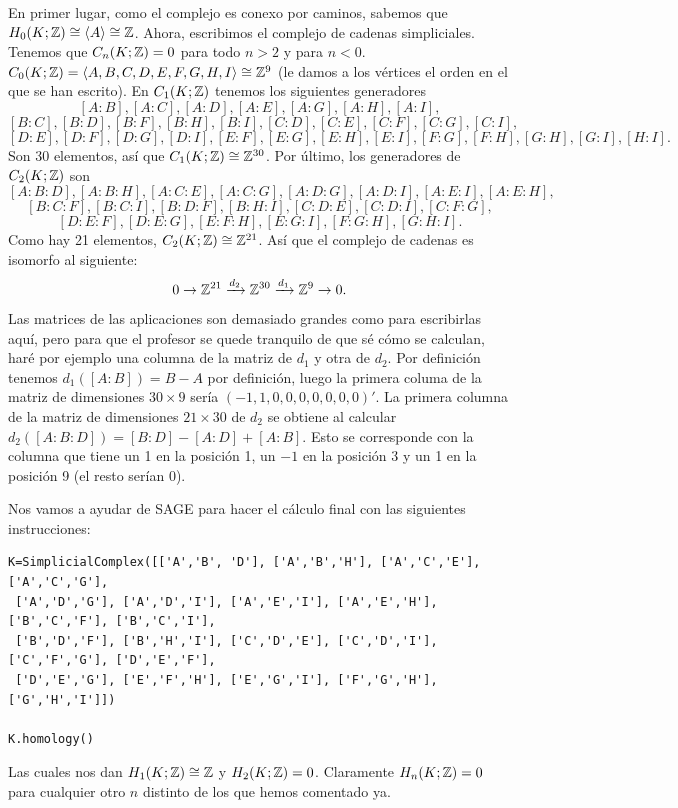 \documentclass[twoside]{article}
\begin{document}
\begin{solucion}
En primer lugar, como el complejo es conexo por caminos, sabemos que $H_0(K;\mathbb{Z})\cong\langle{A}\rangle\cong\mathbb{Z}$. Ahora, escribimos el complejo de cadenas simpliciales. Tenemos que $C_n(K;\mathbb{Z})=0$ para todo $n>2$ y para $n<0$. $C_0(K;\mathbb{Z})=\langle{A,B,C,D,E,F,G,H,I}\rangle\cong\mathbb{Z}^9$ (le damos a los vértices el orden en el que se han escrito). En $C_1(K;\mathbb{Z})$ tenemos los siguientes generadores
\[
[A:B],[A:C], [A:D], [A:E], [A:G], [A:H], [A:I],   
\]
\[
[B:C], [B:D], [B:F], [B:H], [B:I], [C:D], [C:E], [C:F], [C:G], [C:I], 
\]
\[
[D:E], [D:F], [D:G], [D:I], [E:F], [E:G], [E:H], [E:I], [F:G], [F:H], [G:H], [G:I],[H:I].
\]
Son 30 elementos, así que $C_1(K;\mathbb{Z})\cong\mathbb{Z}^{30}$. Por último, los generadores de $C_2(K;\mathbb{Z})$ son
\[
[A:B:D], [A:B:H], [A:C:E], [A:C:G], [A:D:G], [A:D:I], [A:E:I], [A:E:H], 
\]
\[
[B:C:F], [B:C:I], [B:D:F], [B:H:I], [C:D:E], [C:D:I], [C:F:G], 
\]
\[
[D:E:F], [D:E:G], [E:F:H], [E:G:I], [F:G:H], [G:H:I].
\]
Como hay 21 elementos, $C_2(K;\mathbb{Z})\cong\mathbb{Z}^{21}$. Así que el complejo de cadenas es isomorfo al siguiente:
\[
0\to \mathbb{Z}^{21}\xrightarrow{d_2}\mathbb{Z}^{30}\xrightarrow{d_1}\mathbb{Z}^9\to 0.
\]
Las matrices de las aplicaciones son demasiado grandes como para escribirlas aquí, pero para que el profesor se quede tranquilo de que sé cómo se calculan, haré por ejemplo una columna de la matriz de $d_1$ y otra de $d_2$. Por definición tenemos $d_1([A:B])=B-A$ por definición, luego la primera columa de la matriz de dimensiones $30\times 9$ sería $(-1, 1, 0,0,0,0,0,0,0)'$. La primera columna de la matriz de dimensiones $21\times 30$ de $d_2$ se obtiene al calcular $d_2([A:B:D])=[B:D]-[A:D]+[A:B]$. Esto se corresponde con la columna que tiene un 1 en la posición 1, un $-1$ en la posición 3 y un 1 en la posición 9 (el resto serían 0). 

Nos vamos a ayudar de SAGE para hacer el cálculo final con las siguientes instrucciones:

\begin{verbatim}
K=SimplicialComplex([['A','B', 'D'], ['A','B','H'], ['A','C','E'], ['A','C','G'],
 ['A','D','G'], ['A','D','I'], ['A','E','I'], ['A','E','H'],['B','C','F'], ['B','C','I'], 
 ['B','D','F'], ['B','H','I'], ['C','D','E'], ['C','D','I'], ['C','F','G'], ['D','E','F'], 
 ['D','E','G'], ['E','F','H'], ['E','G','I'], ['F','G','H'], ['G','H','I']])

K.homology()
\end{verbatim}

Las cuales nos dan $H_1(K;\mathbb{Z})\cong\mathbb{Z}$ y $H_2(K;\mathbb{Z})=0$. Claramente $H_n(K;\mathbb{Z})=0$ para cualquier otro $n$ distinto de los que hemos comentado ya. 
\end{solucion}
\end{document}
